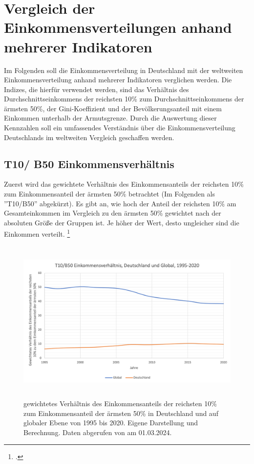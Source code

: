 \chapter{Vergleich der Einkommensverteilungen anhand mehrerer Indikatoren}

Im Folgenden soll die Einkommensverteilung in Deutschland mit der weltweiten Einkommensverteilung anhand mehrerer Indikatoren verglichen werden. Die Indizes, die hierfür verwendet werden, sind das Verhältnis des Durchschnittseinkommens der reichsten 10\% zum Durchschnittseinkommens der ärmsten 50\%, der Gini-Koeffizient und der Bevölkerungsanteil mit einem Einkommen unterhalb der Armutsgrenze. Durch die Auswertung dieser Kennzahlen soll ein umfassendes Verständnis über die Einkommensverteilung Deutschlands im weltweiten Vergleich geschaffen werden.
\section{T10/ B50 Einkommensverhältnis}

Zuerst wird das gewichtete Verhältnis des Einkommensanteils der reichsten 10\% zum Einkommensanteil der ärmsten 50\% betrachtet (Im Folgenden als ''T10/B50'' abgekürzt). Es gibt an, wie hoch der Anteil der reichsten 10\% am Gesamteinkommen im Vergleich zu den ärmsten 50\% gewichtet nach der absoluten Grö{\ss}e der Gruppen ist. Je höher der Wert, desto ungleicher sind die Einkommen verteilt. \footcite[Vgl.][S. 31]{wir_2022}

\begin{figure}[H]
    \centering
    \includegraphics[height=8.15cm]{Bilder/T10B50-Ratio3.png}
    \caption[T10/B50 Einkommensverhältnis, Deutschland und global, 1995-2020]{gewichtetes Verhältnis des Einkommensanteils der reichsten 10\% zum Einkommensanteil der ärmsten 50\% in Deutschland und auf globaler Ebene von 1995 bis 2020. Eigene Darstellung und Berechnung. Daten abgerufen von \cite[][, S.55, 195]{wir_2022} am 01.03.2024.}
    \label{fig:iso_norm}
\end{figure}

